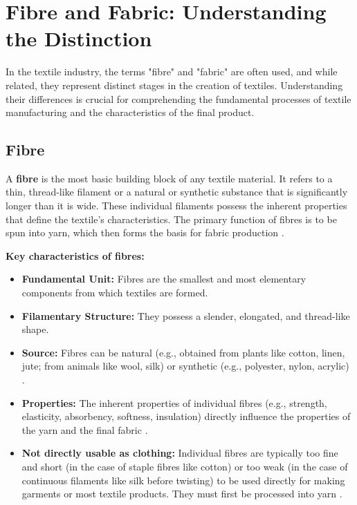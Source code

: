 \section{Fibre and Fabric: Understanding the Distinction}

In the textile industry, the terms "fibre" and "fabric" are often used, and while related, they represent distinct stages in the creation of textiles. Understanding their differences is crucial for comprehending the fundamental processes of textile manufacturing and the characteristics of the final product.

\subsection{Fibre}

A \textbf{fibre} is the most basic building block of any textile material. It refers to a thin, thread-like filament or a natural or synthetic substance that is significantly longer than it is wide. These individual filaments possess the inherent properties that define the textile's characteristics. The primary function of fibres is to be spun into yarn, which then forms the basis for fabric production \cite{researchgate}.

\textbf{Key characteristics of fibres:}
\begin{itemize}
    \item \textbf{Fundamental Unit:} Fibres are the smallest and most elementary components from which textiles are formed.
    \item \textbf{Filamentary Structure:} They possess a slender, elongated, and thread-like shape.
    \item \textbf{Source:} Fibres can be natural (e.g., obtained from plants like cotton, linen, jute; from animals like wool, silk) or synthetic (e.g., polyester, nylon, acrylic) \cite{researchgate}.
    \item \textbf{Properties:} The inherent properties of individual fibres (e.g., strength, elasticity, absorbency, softness, insulation) directly influence the properties of the yarn and the final fabric \cite{researchgate}.
    \item \textbf{Not directly usable as clothing:} Individual fibres are typically too fine and short (in the case of staple fibres like cotton) or too weak (in the case of continuous filaments like silk before twisting) to be used directly for making garments or most textile products. They must first be processed into yarn \cite{researchgate}.
\end{itemize}

